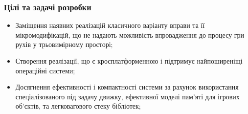 \subsubsection{Цілі та задачі розробки}

\begin{itemize}
  \item Заміщення наявних реалізацій класичного варіанту вправи та її мікромодифікацій, що не надають можливість впровадження до процесу гри рухів у трьовимірному просторі;
  \item Створення реалізації, що є кросплатформенною і підтримує найпоширеніщі операційні системи;
  \item Досягнення ефективності і компактності системи за рахунок використання спеціалізованого під задачу движку, ефективної моделі пам'яті для ігрових об'єктів, та легковагового стеку бібліотек;
\end{itemize}